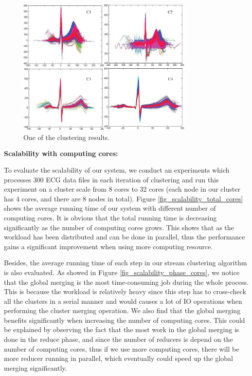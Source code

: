 \documentclass[conference]{IEEEtran}
\begin{document}
\begin{figure}[!t]
\centering
\includegraphics[height=2.7in]{./Figure/clustering_result.eps}
\caption{One of the clustering results.}
\label{fig_clustering_result}
\end{figure}

\textbf{Scalability with computing cores:}


To evaluate the scalability of our system, we conduct an experiments which processes 300 ECG data files in each iteration of clustering and run this experiment on a cluster scale from 8 cores to 32 cores (each node in our cluster has 4 cores, and there are 8 nodes in total). Figure \ref{fig_scalability_total_cores} shows the average running time of our system with different number of computing cores. It is obvious that the total running time is decreasing significantly as the number of computing cores grows. This shows that as the workload has been distributed and can be done in parallel, thus the performance gains a significant improvement when using more computing resource. 


Besides, the average running time of each step in our stream clustering algorithm is also evaluated. As showed in Figure \ref{fig_scalability_phase_cores}, we notice that the global merging is the most time-consuming job during the whole process. This is because the workload is relatively heavy since this step has to cross-check all the clusters in a serial manner and would causes a lot of IO operations when performing the cluster merging operation. We also find that the global merging benefits significantly when increasing the number of computing cores. This could be explained by observing the fact that the most work in the global merging is done in the reduce phase, and since the number of reducers is depend on the number of computing cores, thus if we use more computing cores, there will be more reducer running in parallel, which eventually could speed up the global merging significantly.
\end{document}
